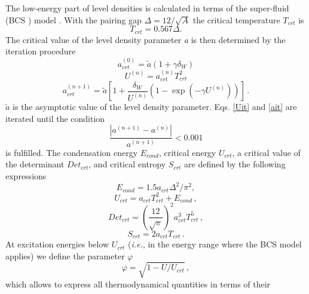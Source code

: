 The low-energy part of level densities is calculated in terms of the
super-fluid (BCS%
) model \cite{igna}. With the pairing gap $\Delta=12/%
\sqrt{A}$ the critical temperature $T_{crt}$ is
\begin{equation}
T_{crt}=0.567\Delta.  \label{Tcrt}
\end{equation}
The critical value of the level density parameter \emph{a} is then
determined by the iteration procedure
\begin{equation}
a_{crt}^{(0)}=\widetilde{a}\left(1+\gamma\delta_{W}\right)  \label{ait0}
\end{equation}
\begin{equation}
U^{(n)}=a_{crt}^{(n)}T_{crt}^{2}  \label{Uit}
\end{equation}
\begin{equation}
a_{crt}^{(n+1)}=\widetilde{a}\left[1+\frac{\delta_{W}}{U^{(n)}}%
\left(1-\exp\left(-\gamma U^{(n)}\right)\right)\right]\,.  \label{ait}
\end{equation}
$\widetilde{a}$ is the asymptotic value of the level density parameter. Eqs. %
\ref{Uit} and \ref{ait} are iterated until the condition
\begin{equation}
\frac{\left|a^{(n+1)}-a^{(n)}\right|}{a^{(n+1)}}<0.001  \label{itercond}
\end{equation}
is fulfilled. The condensation energy $E_{cond}$, critical energy $U_{crt}$,
a critical value of the determinant $Det_{crt}$, and critical entropy $%
S_{crt}$ are defined by the following expressions
\begin{equation}
E_{cond}=1.5a_{crt}\Delta^{2}/\pi^{2},  \label{Econd}
\end{equation}
\begin{equation}
U_{crt}=a_{crt}T_{crt}^{2}+E_{cond}\,,  \label{Ucrt}
\end{equation}
\begin{equation}
Det_{crt}=\left(\frac{12}{\sqrt{\pi}}\right)^{2}a_{crt}^{3}T_{crt}^{5}\,,
\label{Detcrt}
\end{equation}
\begin{equation}
S_{crt}=2a_{crt}T_{crt}\,.  \label{Scrt}
\end{equation}
At excitation energies below $U_{crt}$ (\textit{i.e.}, in the energy range
\noindent where the BCS%
 model applies) we define the parameter $\varphi$
\begin{equation}
\varphi=%
\sqrt{1-U/U_{crt}}\,,  \label{fiign}
\end{equation}
which allows to express all thermodynamical quantities in terms of their
